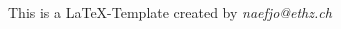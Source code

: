 



\maketitle
\begin{center}
This is a \LaTeX-Template created by \textit{naefjo@ethz.ch}
\end{center}
\newpage
\begin{multicols*}{3}



\end{multicols*}     

